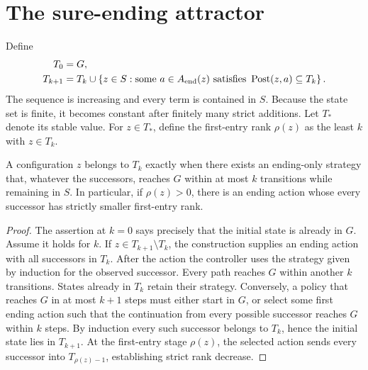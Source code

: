 \section{The sure-ending attractor}
Define
\begin{align*}
T_0&=G,\\
T_{k+1}&=T_k\cup\left\{z\in S:\text{some }a\in A_{\rm end}(z)
\text{ satisfies }\operatorname{Post}(z,a)\subseteq T_k\right\}.
\end{align*}
The sequence is increasing and every term is contained in $S$. Because the state set is finite, it becomes constant after finitely many strict additions. Let $T_*$ denote its stable value. For $z\in T_*$, define the first-entry rank $\rho(z)$ as the least $k$ with $z\in T_k$.

\begin{lemma}\label{r:end-horizon}
A configuration $z$ belongs to $T_k$ exactly when there exists an ending-only strategy that, whatever the successors, reaches $G$ within at most $k$ transitions while remaining in $S$. In particular, if $\rho(z)>0$, there is an ending action whose every successor has strictly smaller first-entry rank.
\end{lemma}
\begin{proof}
The assertion at $k=0$ says precisely that the initial state is already in $G$. Assume it holds for $k$. If $z\in T_{k+1}\setminus T_k$, the construction supplies an ending action with all successors in $T_k$. After the action the controller uses the strategy given by induction for the observed successor. Every path reaches $G$ within another $k$ transitions. States already in $T_k$ retain their strategy. Conversely, a policy that reaches $G$ in at most $k+1$ steps must either start in $G$, or select some first ending action such that the continuation from every possible successor reaches $G$ within $k$ steps. By induction every such successor belongs to $T_k$, hence the initial state lies in $T_{k+1}$. At the first-entry stage $\rho(z)$, the selected action sends every successor into $T_{\rho(z)-1}$, establishing strict rank decrease.
\end{proof}


